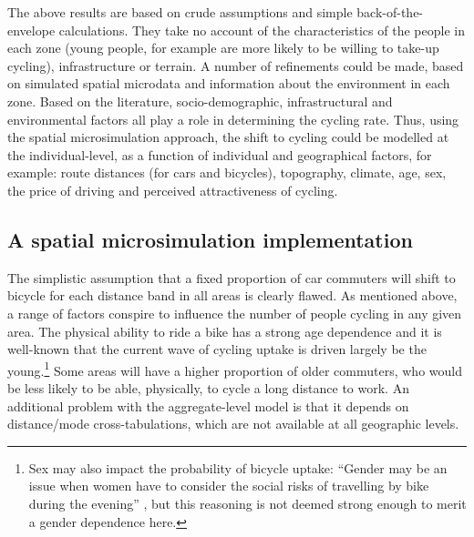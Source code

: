 The above results are based on crude assumptions and simple
back-of-the-envelope calculations. They take no account of the characteristics
of the people in each zone (young people, for example are more likely to be
willing to take-up cycling), infrastructure or terrain. A number of refinements
could be made, based on simulated spatial microdata and information about the
environment in each zone. Based on the literature, socio-demographic,
infrastructural and environmental factors all play a role in determining the
cycling rate. Thus, using the spatial microsimulation approach, the shift to
cycling could be modelled at the individual-level, as a function of
individual and geographical factors, for example:
route distances (for cars and bicycles), topography, climate, age, sex,
the price of driving and perceived attractiveness of cycling. 
\subsection{A spatial microsimulation implementation}
The simplistic assumption that a fixed proportion of car commuters will
shift to bicycle for each distance band in all areas is clearly flawed.
As mentioned above, a range of factors conspire to influence the number of
people cycling in any given area. The physical ability to ride a bike
has a strong age dependence and it is well-known that the current wave
of cycling uptake is driven largely be the
young.\footnote{Sex
may also impact the probability of bicycle uptake: ``Gender may be an issue when
women have to consider the social risks of travelling by bike during the
evening'' \citep[p.~532]{Rietveld2004}, but this reasoning is not deemed
strong enough to merit a gender dependence here.
}
Some areas will have a higher proportion of older commuters, who would
be less likely to be able, physically, to cycle a long distance to work.
An additional problem with the aggregate-level model is that it depends
on distance/mode cross-tabulations, which are not available at all
geographic levels.

